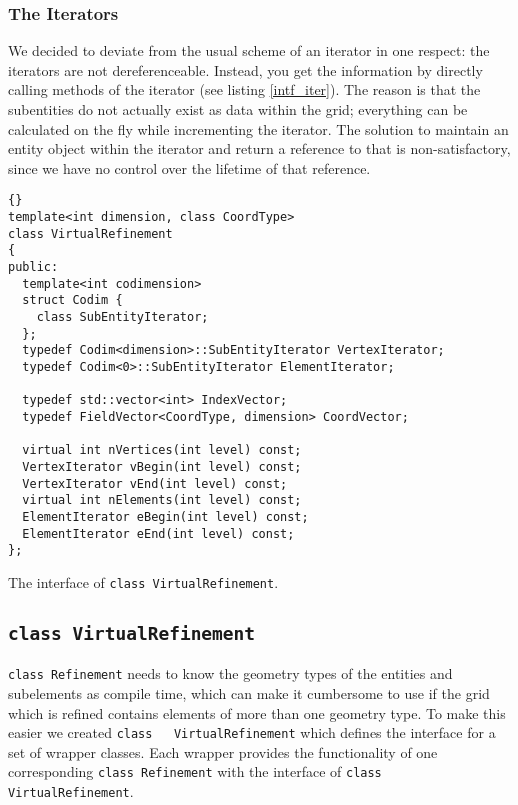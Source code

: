 \documentclass[english,a4paper]{article}
\newcommand{\code}[1]{\textnormal{\lstinline{#1}}}
\begin{document}
\subsubsection{The Iterators}

We decided to deviate from the usual scheme of an iterator in one
respect: the iterators are not dereferenceable.  Instead, you get the
information by directly calling methods of the iterator (see listing
\ref{intf_iter}).  The reason is that the subentities do not actually
exist as data within the grid; everything can be calculated on the fly
while incrementing the iterator.  The solution to maintain an entity
object within the iterator and return a reference to that is
non-satisfactory, since we have no control over the lifetime of that
reference.

\begin{Listing}
  \begin{lstlisting}{}
template<int dimension, class CoordType>
class VirtualRefinement
{
public:
  template<int codimension>
  struct Codim {
    class SubEntityIterator;
  };
  typedef Codim<dimension>::SubEntityIterator VertexIterator;
  typedef Codim<0>::SubEntityIterator ElementIterator;

  typedef std::vector<int> IndexVector;
  typedef FieldVector<CoordType, dimension> CoordVector;

  virtual int nVertices(int level) const;
  VertexIterator vBegin(int level) const;
  VertexIterator vEnd(int level) const;
  virtual int nElements(int level) const;
  ElementIterator eBegin(int level) const;
  ElementIterator eEnd(int level) const;
};
  \end{lstlisting}
  \caption{The interface of \code{class VirtualRefinement}.}
  \label{intf_virt}
\end{Listing}

\subsection{\code{class VirtualRefinement}}

\code{class Refinement} needs to know the geometry types of the
entities and subelements as compile time, which can make it cumbersome
to use if the grid which is refined contains elements of more than one
geometry type.  To make this easier we created \code{class
  VirtualRefinement} which defines the interface for a set of wrapper
classes.  Each wrapper provides the functionality of one corresponding
\code{class Refinement} with the interface of \code{class
  VirtualRefinement}.
\end{document}

